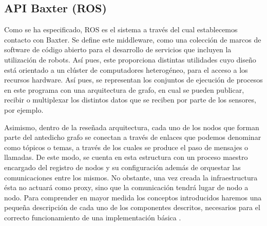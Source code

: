 \subsection{API Baxter (ROS)}

Como se ha especificado, ROS es el sistema a través del cual establecemos contacto con Baxter. Se define este middleware, como una colección de marcos de software de código abierto para el desarrollo de servicios que incluyen la utilización de robots. Así pues, este proporciona distintas utilidades cuyo diseño está orientado a un clúster de computadores heterogéneo, para el acceso a los recursos hardware. Así pues, se representan los conjuntos de ejecución de procesos en este programa con una arquitectura de grafo, en cual se pueden publicar, recibir o multiplexar los distintos datos que se reciben por parte de los sensores, por ejemplo.

Asimismo, dentro de la reseñada arquitectura, cada uno de los nodos que forman parte del antedicho grafo se conectan a través de enlaces que podemos denominar como tópicos o temas, a través de los cuales se produce el paso de mensajes o llamadas. De este modo, se cuenta en esta estructura con un proceso maestro encargado del registro de nodos y su configuración además de orquestar las comunicaciones entre los mismos. No obstante, una vez creada la infraestructura ésta no actuará como proxy, sino que la comunicación tendrá lugar de nodo a nodo. Para comprender en mayor medida los conceptos introducidos haremos una pequeña descripción de cada uno de los componentes descritos, necesarios para el correcto funcionamiento de una implementación básica \cite{71}.

